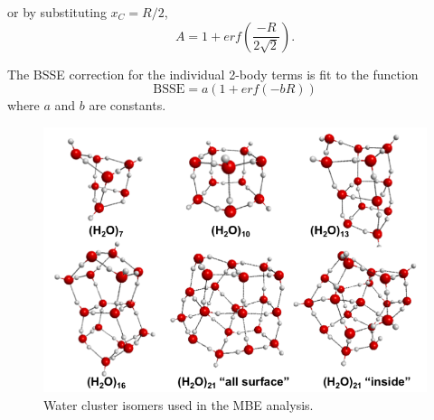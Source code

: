 \documentclass[11pt, proquest]{uwthesis}[2020/02/24]
\begin{document}
or by substituting $x_C=R/2$,
\begin{equation}\label{eq:MBE_I_1}
    A=1+erf\left(\frac{-R}{2\sqrt{2}}\right).
\end{equation}

The BSSE correction for the individual 2-body terms is fit to the function
\begin{equation}\label{eq:MBE_I_2}
    \mathrm{BSSE}=a(1+erf(-bR))
\end{equation}
where $a$ and $b$ are constants.

\begin{figure}[t]
\uwsinglespace
\centering
\includegraphics[width=\textwidth]{Figures/Chapter_2/cluster_structures.png}
\caption[Water cluster isomers used in the MBE analysis.]{Water cluster isomers used in the MBE analysis.}
\label{fig:MBE_I_F1}
\end{figure}
\end{document}
